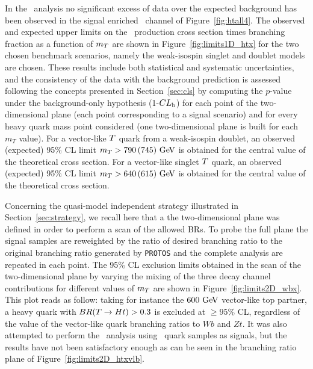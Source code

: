 In the \htx\ analysis no significant excess of data over the 
expected background has been observed in the signal enriched 
\chiv\ channel of Figure~\ref{fig:htall4}.
The observed and expected upper limits on the \TTbar\ production cross section 
times branching fraction as a function of $m_{\T}$ are shown in 
Figure~\ref{fig:limits1D_htx} for the two chosen benchmark scenarios,
namely the weak-isospin singlet and
doublet models are chosen.
These results include both statistical and systematic uncertainties,
and the consistency of the data with the background prediction is 
assessed following the concepts presented in Section~\ref{sec:cls}
by computing the $p$-value under the background-only hypothesis
(1-$CL_{\rm b}$) for each point of the two-dimensional plane 
(each point corresponding to a signal scenario) and for every heavy 
quark mass point considered (one two-dimensional plane is built for each
$m_T$ value). For a vector-like $\T$ quark from a weak-isospin doublet, an observed (expected) 95\%  CL  limit
$m_{T}>790\,(745)\gev$ is obtained for the central value of the 
theoretical cross section.
For a vector-like singlet $\T$ quark, an observed (expected) 95\%  CL  limit 
$m_{\T}>640\,(615)\gev$ is obtained for the central value of the 
theoretical cross section.


Concerning the quasi-model independent strategy illustrated in Section~\ref{sec:strategy}, 
we recall here that a the two-dimensional plane was defined in order
to perform a scan of the allowed BRs.
To probe the full plane the signal samples are reweighted by the ratio
of desired branching ratio to the original branching ratio generated
by \texttt{PROTOS} and the complete analysis are repeated in each point.
The  95\% CL exclusion limits  obtained in the scan of the two-dimensional
plane by varying the mixing of the three decay channel contributions for
different values of $m_{\T}$ are shown in Figure~\ref{fig:limits2D_wbx}. 
This plot reads as follow: taking for instance the $600\gev$ 
vector-like top partner, a heavy quark with
$BR(\T\to Ht)>0.3$ is excluded at $\geq 95\%$ CL,
regardless of the value of the vector-like quark branching ratios to $Wb$ and $Zt$.  
It was also attempted to perform the \htx\ analysis
using \B\ quark samples as signals, but the results
have not been satisfactory enough as can be seen in the
branching ratio plane of Figure~\ref{fig:limits2D_htxvlb}.


